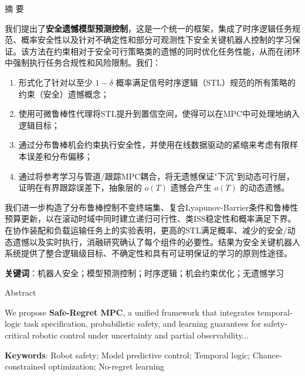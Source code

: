 \documentclass[12pt,a4paper]{ctexart}
\numberwithin{equation}{section}
\begin{document}

\clearpage
\begin{center}
{\heiti{} 摘 要}
\end{center}

\setlength{\parindent}{2em}

我们提出了\textbf{安全遗憾模型预测控制}，这是一个统一的框架，集成了时序逻辑任务规范、概率安全性以及针对不确定性和部分可观测性下安全关键机器人控制的学习保证。该方法在约束相对于安全可行策略类的遗憾的同时优化任务性能，从而在闭环中强制执行任务合规性和风险限制。我们：

\begin{enumerate}[label=(\arabic*)]
    \item 形式化了针对以至少 $1-\delta$ 概率满足信号时序逻辑（STL）规范的所有策略的约束（安全）遗憾概念；
    \item 使用可微鲁棒性代理将STL提升到置信空间，使得可以在MPC中可处理地纳入逻辑目标；
    \item 通过分布鲁棒机会约束执行安全性，并使用在线数据驱动的紧缩来考虑有限样本误差和分布偏移；
    \item 通过将参考学习与管道/跟踪MPC耦合，将无遗憾保证"下沉"到动态可行层，证明在有界跟踪误差下，抽象层的 $o(T)$ 遗憾会产生 $o(T)$ 的动态遗憾。
\end{enumerate}

我们进一步构造了分布鲁棒控制不变终端集、复合Lyapunov-Barrier条件和鲁棒性预算更新，以在滚动时域中同时建立递归可行性、类ISS稳定性和概率满足下界。在协作装配和负载运输任务上的实验表明，更高的STL满足概率、减少的安全/动态遗憾以及实时执行，消融研究确认了每个组件的必要性。结果为安全关键机器人系统提供了整合逻辑级目标、不确定性和具有可证明保证的学习的原则性途径。

\vspace{1em}
\noindent\textbf{关键词}：\heiti 机器人安全；模型预测控制；时序逻辑；机会约束优化；无遗憾学习

\clearpage
\begin{center}
{\heiti{} Abstract}
\end{center}

We propose \textbf{Safe-Regret MPC}, a unified framework that integrates temporal-logic task specification, probabilistic safety, and learning guarantees for safety-critical robotic control under uncertainty and partial observability...

\vspace{1em}
\noindent\textbf{Keywords}: Robot safety; Model predictive control; Temporal logic; Chance-constrained optimization; No-regret learning
\end{document}
